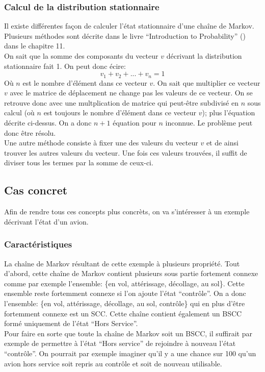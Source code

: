 \documentclass[letterpaper]{article}
\begin{document}
    \subsubsection{Calcul de la distribution stationnaire}
      \label{etat_stationnaire}
      Il existe différentes façon de calculer l'état stationnaire d'une chaîne de Markov.
      Plusieurs méthodes sont décrite dans le livre ``Introduction to Probability'' (\citep{IP}) 
      dans le chapitre 11.\\
      On sait que la somme des composants du vecteur $v$ décrivant la distribution stationnaire 
      fait 1.  On peut donc écire:
      $$v_1 + v_2 + ... + v_n = 1$$
      Où $n$ est le nombre d'élément dans ce vecteur $v$.  On sait que multiplier ce vecteur $v$
      avec le matrice de déplacement ne change pas les valeurs de ce vecteur.  On se retrouve donc
      avec une multplication de matrice qui peut-être subdivisé en $n$ sous calcul (où $n$ est 
      toujours le nombre d'élément dans ce vecteur $v$); plus l'équation décrite ci-dessus.  On a 
      donc $n+1$ équation pour $n$ inconnue.  Le problème peut donc être résolu.\\
      Une autre méthode consiste à fixer une des valeurs du vecteur $v$ et de ainsi trouver les 
      autres valeurs du vecteur.  Une fois ces valeurs trouvées, il suffit de diviser tous les 
      termes par la somme de ceux-ci.
  
  \subsection{Cas concret}
    \label{casconcret}
    Afin de rendre tous ces concepts plus concrèts, on va s'intéresser à un exemple décrivant
    l'état d'un avion.
    
    \subsubsection{Caractéristiques}
      La chaîne de Markov résultant de cette exemple à plusieurs propriété.  Tout
      d'abord, cette chaîne de Markov contient plusieurs sous partie fortement
      connexe comme par exemple l'ensemble: \{en vol, attérissage, décollage,
      au sol\}.  Cette ensemble reste fortemment connexe si l'on ajoute l'état
      ``contrôle''.  On a donc l'ensemble: \{en vol, attérissage, décollage,
      au sol, contrôle\} qui en plus d'être fortemment connexe est un SCC.
      Cette chaîne contient également un BSCC formé uniquement de l'état 
      ``Hors Service''.\\
      Pour faire en sorte que toute la chaîne de Markov soit un BSCC, il suffirait
      par exemple de permettre à l'état ``Hors service'' de rejoindre à nouveau l'état
      ``contrôle''.  On pourrait par exemple imaginer qu'il y a une chance sur 100 qu'un
      avion hors service soit repris au contrôle et soit de nouveau utilisable.
  
\end{document}

